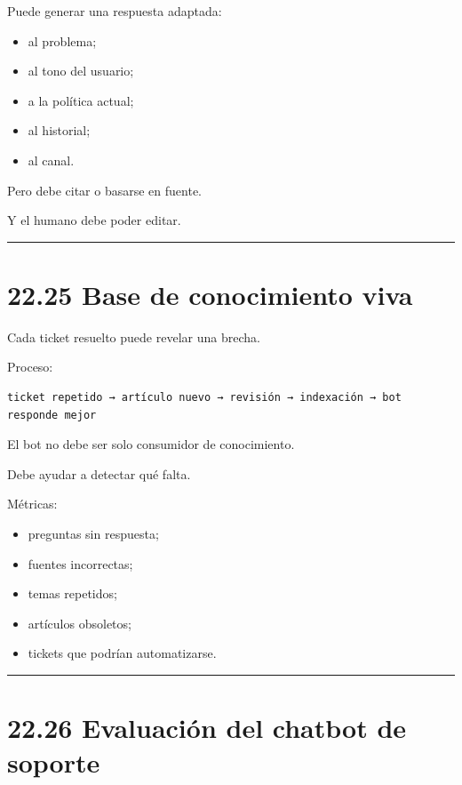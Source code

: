 Puede generar una respuesta adaptada:

\begin{itemize}
\tightlist
\item
  al problema;
\item
  al tono del usuario;
\item
  a la política actual;
\item
  al historial;
\item
  al canal.
\end{itemize}

Pero debe citar o basarse en fuente.

Y el humano debe poder editar.

\begin{center}\rule{0.5\linewidth}{0.5pt}\end{center}

\section{22.25 Base de conocimiento
viva}\label{base-de-conocimiento-viva}

Cada ticket resuelto puede revelar una brecha.

Proceso:

\begin{lstlisting}
ticket repetido → artículo nuevo → revisión → indexación → bot responde mejor
\end{lstlisting}

El bot no debe ser solo consumidor de conocimiento.

Debe ayudar a detectar qué falta.

Métricas:

\begin{itemize}
\tightlist
\item
  preguntas sin respuesta;
\item
  fuentes incorrectas;
\item
  temas repetidos;
\item
  artículos obsoletos;
\item
  tickets que podrían automatizarse.
\end{itemize}

\begin{center}\rule{0.5\linewidth}{0.5pt}\end{center}

\section{22.26 Evaluación del chatbot de
soporte}\label{evaluaciuxf3n-del-chatbot-de-soporte}

